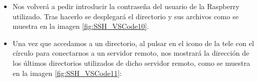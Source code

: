 \begin{itemize}
            \\ 
            \item Nos volverá a pedir introducir la contraseña del usuario de la Raspberry utilizado. Tras hacerlo se desplegará el directorio y sus archivos como se muestra en la imagen \ref{fig:SSH_VSCode10}.
            \\ 
            \item Una vez que accedamos a un directorio, al pulsar en el icono de la tele con el círculo para conectarnos a un servidor remoto, nos mostrará la dirección de los últimos directorios utilizados de dicho servidor remoto, como se muestra en la imagen \ref{fig:SSH_VSCode11}:
            \\ 
        \end{itemize}

